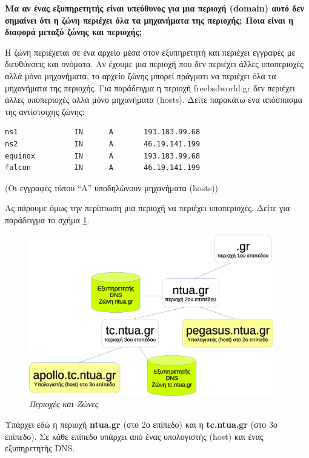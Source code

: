 \begin{inthebox}
\textbf{Μα αν ένας εξυπηρετητής είναι υπεύθυνος για μια περιοχή (domain) αυτό δεν σημαίνει ότι η ζώνη περιέχει όλα τα μηχανήματα της περιοχής; Ποια είναι η διαφορά μεταξύ ζώνης και περιοχής;}

Η ζώνη περιέχεται σε ένα αρχείο μέσα στον εξυπηρετητή και περιέχει εγγραφές με διευθύνσεις και ονόματα. Αν έχουμε μια περιοχή που δεν περιέχει άλλες υποπεριοχές αλλά μόνο μηχανήματα, το αρχείο ζώνης μπορεί πράγματι να περιέχει όλα τα μηχανήματα της περιοχής. Για παράδειγμα η περιοχή freebsdworld.gr δεν περιέχει άλλες υποπεριοχές αλλά μόνο μηχανήματα (hosts). Δείτε παρακάτω ένα απόσπασμα της αντίστοιχης ζώνης:

\begin{verbatim}
ns1             IN      A       193.183.99.68
ns2             IN      A       46.19.141.199
equinox         IN      A       193.183.99.68
falcon          IN      A       46.19.141.199
\end{verbatim}

(Οι εγγραφές τύπου ``Α'' υποδηλώνουν μηχανήματα (hosts))

Ας πάρουμε όμως την περίπτωση μια περιοχή να περιέχει υποπεριοχές. Δείτε για παράδειγμα το σχήμα \ref{6-12}. 

\begin{figure}[!ht]
  \centering
  \includegraphics[width=0.95\textwidth]{images/chapter6/6-12}
  \caption {\textsl{Περιοχές και Ζώνες}}
  \label{6-12}
\end{figure}

Υπάρχει εδώ η περιοχή \textbf{ntua.gr} (στο 2ο επίπεδο) και η \textbf{tc.ntua.gr} (στο 3ο επίπεδο). Σε κάθε επίπεδο υπάρχει από ένας υπολογιστής (host) και ένας εξυπηρετητής DNS.


\end{inthebox}
